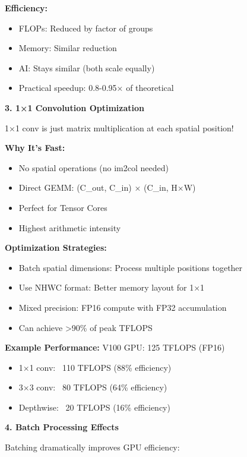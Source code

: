 \documentclass[12pt]{article}
\newcommand{\explanation}[1]{{\color{explanationcolor}#1}}
\begin{document}
\begin{enumerate}[(a)]
{{    \textbf{Efficiency:}
    \begin{itemize}
        \item FLOPs: Reduced by factor of groups
        \item Memory: Similar reduction
        \item AI: Stays similar (both scale equally)
        \item Practical speedup: 0.8-0.95× of theoretical
    \end{itemize}
    }
    
    \textbf{3. 1×1 Convolution Optimization}
    
    \explanation{
    1×1 conv is just matrix multiplication at each spatial position!
    
    \textbf{Why It's Fast:}
    \begin{itemize}
        \item No spatial operations (no im2col needed)
        \item Direct GEMM: (C_out, C_in) × (C_in, H×W)
        \item Perfect for Tensor Cores
        \item Highest arithmetic intensity
    \end{itemize}
    
    \textbf{Optimization Strategies:}
    \begin{itemize}
        \item Batch spatial dimensions: Process multiple positions together
        \item Use NHWC format: Better memory layout for 1×1
        \item Mixed precision: FP16 compute with FP32 accumulation
        \item Can achieve >90\% of peak TFLOPS
    \end{itemize}
    
    \textbf{Example Performance:}
    V100 GPU: 125 TFLOPS (FP16)
    \begin{itemize}
        \item 1×1 conv: ~110 TFLOPS (88\% efficiency)
        \item 3×3 conv: ~80 TFLOPS (64\% efficiency)
        \item Depthwise: ~20 TFLOPS (16\% efficiency)
    \end{itemize}
    }
    
    \textbf{4. Batch Processing Effects}
    
    \explanation{
    Batching dramatically improves GPU efficiency:
    
}}
\end{enumerate}
\end{document}
